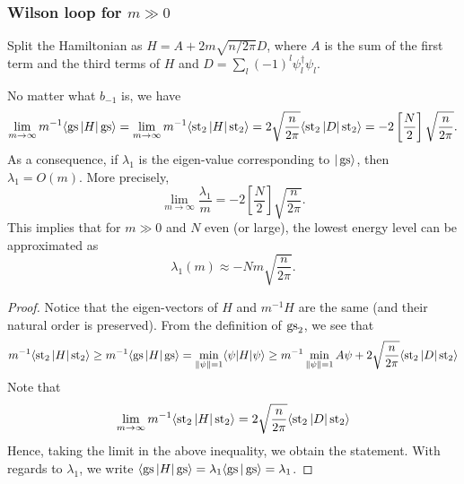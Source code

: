 \subsubsection{Wilson loop for $m \gg 0$}
Split the Hamiltonian as $H = A + 2m\sqrt{n/2\pi} D$, where $A$ is the sum of the first term and the third terms of $H$ and $D = \sum_l (-1)^l \psi_l^\dagger \psi_l$.
\begin{proposition}
No matter what $b_{-1}$ is, we have
\[
\lim_{m \rightarrow \infty}m^{-1} \langle \operatorname{gs} | H| \operatorname{gs}\rangle = \lim_{m \rightarrow \infty} m^{-1}\langle \operatorname{st}_2 | H| \operatorname{st}_2 \rangle =  2\sqrt{\frac{n}{2\pi}} \langle \operatorname{st}_2 | D| \operatorname{st}_2\rangle = -2\left[\frac{N}{2}\right]\sqrt{\frac{n}{2\pi}}.
\]
As a consequence, if $\lambda_1$ is the eigen-value corresponding to $|\operatorname{gs}\rangle$, then $\lambda_1 = O(m)$. More precisely, 
\[
\lim_{m \rightarrow \infty} \frac{\lambda_1}{m} = -2\left[\frac{N}{2}\right]\sqrt{\frac{n}{2\pi}}.
\]
This implies that for $m \gg 0$ and $N$ even (or large), the lowest energy level can be approximated as 
\[
\lambda_1(m) \approx - Nm \sqrt{\frac{n}{2\pi}}.
\]
\end{proposition}
\begin{proof}
Notice that the eigen-vectors of $H$ and $m^{-1}H$ are the same (and their natural order is preserved). From the definition of $\operatorname{gs}_2$, we see that
\[
m^{-1}\langle \operatorname{st}_2 | H| \operatorname{st}_2 \rangle \geq m^{-1}\langle \operatorname{gs} | H| \operatorname{gs} \rangle = \min_{\|\psi\|=1} \langle \psi |H|\psi\rangle \geq m^{-1}\min_{\|\psi\|=1} A\psi + 2\sqrt{\frac{n}{2\pi}} \langle \operatorname{st}_2 | D| \operatorname{st}_2\rangle 
\]
Note that 
\[
\lim_{m\rightarrow \infty} m^{-1}\langle \operatorname{st}_2 | H|\operatorname{st}_2 \rangle = 2\sqrt{\frac{n}{2\pi}} \langle \operatorname{st}_2 | D| \operatorname{st}_2\rangle
\]
Hence, taking the limit in the above inequality, we obtain the statement. With regards to $\lambda_1$, we write $\langle \operatorname{gs} | H| \operatorname{gs} \rangle = \lambda_1\langle \operatorname{gs} |\operatorname{gs}\rangle = \lambda_1$.
\end{proof}



